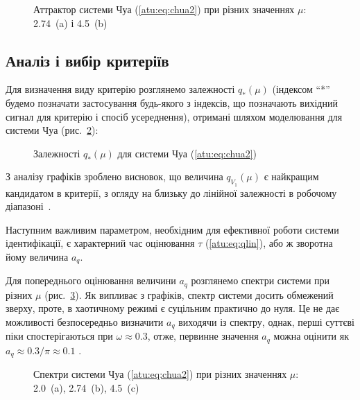 \begin{figure}[htb!]
  \caption{Аттрактор системи Чуа (\ref{atu:eq:chua2}) при різних значеннях $\mu$: 2.74~(a) і 4.5~(b)}
  \label{atu:f:chua_phase}
\end{figure}



\subsection{Аналіз і вибір критеріїв}%


Для визначення виду критерію розглянемо залежності
$q_{*}(\mu)$ (індексом ``*'' будемо позначати застосування будь-якого
з індексів, що позначають вихідний сигнал для критерію і спосіб
усереднення), отримані шляхом моделювання для системи Чуа (рис.~\ref{atu:f:chua_q}):

\begin{figure}[htb!]
  \caption{Залежності $q_{*}(\mu) $ для системи Чуа (\ref{atu:eq:chua2})}
\label{atu:f:chua_q}
\end{figure}

З аналізу графіків зроблено висновок, що величина $q_{V_1}(\mu)$
є найкращим кандидатом в критерії, з огляду на близьку до
лінійної залежності в робочому діапазоні~\cite{atu_apir2011}.

Наступним важливим параметром, необхідним для ефективної
роботи системи ідентифікації, є характерний час оцінювання
$\tau$ (\ref{atu:eq:qlin}), або ж зворотна йому величина
$a_q$.

Для попереднього оцінювання величини
$a_q$ розглянемо спектри системи при різних
$\mu$ (рис.~\ref{atu:f:chua_spectrum}). Як випливає з графіків, спектр системи
досить обмежений зверху, проте, в хаотичному режимі є суцільним
практично до нуля. Це не дає можливості безпосередньо визначити
$ a_q $ виходячи із спектру, однак, перші суттєві піки
спостерігаються при
$\omega \approx 0.3 $, отже, первинне значення
$a_q $ можна оцінити як
$a_q \approx 0.3 / \pi \approx 0.1 $ .


\begin{figure}[htb!]
  \caption{Спектри системи Чуа (\ref{atu:eq:chua2}) при різних значеннях $\mu$: 2.0~(a), 2.74~(b), 4.5~(c)}
  \label{atu:f:chua_spectrum}
\end{figure}

